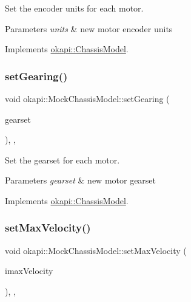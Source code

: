 Set the encoder units for each motor. 


\begin{DoxyParams}{Parameters}
{\em units} & new motor encoder units \\
\hline
\end{DoxyParams}


Implements \mbox{\hyperlink{classokapi_1_1ChassisModel_ae8ba9a72bf827af4c6feffaac99b33ee}{okapi\+::\+Chassis\+Model}}.

\mbox{\label{classokapi_1_1MockChassisModel_a86cf41b7e6ac3e3a042434a6722dfe40}} 
\subsubsection{\texorpdfstring{setGearing()}{setGearing()}}
{\footnotesize\ttfamily void okapi\+::\+Mock\+Chassis\+Model\+::set\+Gearing (\begin{DoxyParamCaption}\item[{\mbox{\hyperlink{classokapi_1_1AbstractMotor_a88aaa6ea2fa10f5520a537bbf26774d5}{Abstract\+Motor\+::gearset}}}]{gearset }\end{DoxyParamCaption})\hspace{0.3cm}{\ttfamily [inline]}, {\ttfamily [override]}, {\ttfamily [virtual]}}



Set the gearset for each motor. 


\begin{DoxyParams}{Parameters}
{\em gearset} & new motor gearset \\
\hline
\end{DoxyParams}


Implements \mbox{\hyperlink{classokapi_1_1ChassisModel_a960d6ce2f21e5832fce1d7566408cb61}{okapi\+::\+Chassis\+Model}}.

\mbox{\label{classokapi_1_1MockChassisModel_ac3dcc46422466c8682cc8bc948535d7b}} 
\subsubsection{\texorpdfstring{setMaxVelocity()}{setMaxVelocity()}}
{\footnotesize\ttfamily void okapi\+::\+Mock\+Chassis\+Model\+::set\+Max\+Velocity (\begin{DoxyParamCaption}\item[{double}]{imax\+Velocity }\end{DoxyParamCaption})\hspace{0.3cm}{\ttfamily [inline]}, {\ttfamily [override]}, {\ttfamily [virtual]}}




